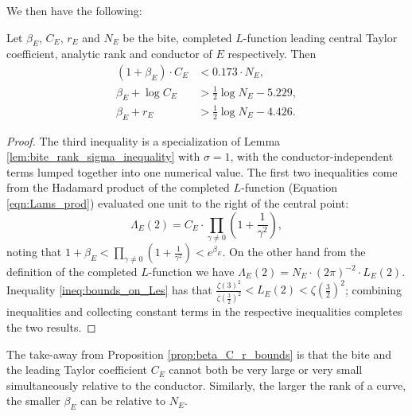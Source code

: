 We then have the following:
\begin{proposition}[GRH]\label{prop:beta_C_r_bounds}
Let $\beta_E$, $C_E$, $r_E$ and $N_E$ be the bite, completed $L$-function leading central Taylor coefficient, analytic rank and conductor of $E$ respectively. Then
\begin{align}
(1+\beta_E)\cdot C_E & < 0.173 \cdot N_E, \\
\beta_E + \log C_E &> \frac{1}{2} \log N_E - 5.229,  \\
\beta_E + r_E & > \frac{1}{2} \log N_E - 4.426.
\end{align}
\end{proposition}
\begin{proof}
The third inequality is a specialization of Lemma \ref{lem:bite_rank_sigma_inequality} with $\sigma=1$, with the conductor-independent terms lumped together into one numerical value. The first two inequalities come from the Hadamard product of the completed $L$-function (Equation \ref{eqn:Lams_prod}) evaluated one unit to the right of the central point:
\begin{equation}
\Lambda_E(2) = C_E\cdot \prod_{\gamma \ne 0} \left(1+\frac{1}{\gamma^2}\right),
\end{equation}
noting that $1+\beta_E < \prod_{\gamma \ne 0} \left(1+\frac{1}{\gamma^2}\right) < e^{\beta_E}$. On the other hand from the definition of the completed $L$-function we have $\Lambda_E(2) = N_E \cdot (2\pi)^{-2}\cdot  L_E(2)$. Inequality \ref{ineq:bounds_on_Les} has that $\frac{\zeta(3)^2}{\zeta(\frac{3}{2})^2} < L_E(2) < \zeta\left(\frac{3}{2}\right)^2$; combining inequalities and collecting constant terms in the respective inequalities completes the two results.
\end{proof}
The take-away from Proposition \ref{prop:beta_C_r_bounds} is that the bite and the leading Taylor coefficient $C_E$ cannot both be very large or very small simultaneously relative to the conductor. Similarly, the larger the rank of a curve, the smaller $\beta_E$ can be relative to $N_E$. \\

